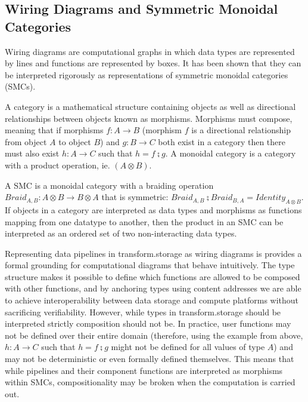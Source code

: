 \documentclass[9pt, oneside]{article}   	%
\begin{document}
\begin{multicols}{2}


\subsection{Wiring Diagrams and Symmetric Monoidal Categories}\label{smc}

Wiring diagrams are computational graphs in which data types are represented by lines and functions are represented by boxes. It has been shown that they can be interpreted rigorously as representations of symmetric monoidal categories (SMCs). \cite{Patterson_2021} 


A category is a mathematical structure containing objects as well as directional relationships between objects known as morphisms. Morphisms must compose, meaning that if morphisms $f : A \rightarrow B$ (morphism $f$ is a directional relationship from object $A$ to object $B$) and $g : B \rightarrow C$ both exist in a category then there must also exist $h : A \rightarrow C$ such that $h = f \zcmp g$. A monoidal category is a category with a product operation, ie. $(A \otimes B)$. 

A SMC is a monoidal category with a braiding operation $Braid_{A,B} : A \otimes B \rightarrow B \otimes A$ that is symmetric: $Braid_{A,B} \zcmp Braid_{B,A}=Identity_{A \otimes B}$. If objects in a category are interpreted as data types and morphisms as functions mapping from one datatype to another, then the product in an SMC can be interpreted as an ordered set of two non-interacting data types. 

Representing data pipelines in transform.storage as wiring diagrams is provides a formal grounding for computational diagrams that behave intuitively. The type structure makes it possible to define which functions are allowed to be composed with other functions, and by anchoring types using content addresses we are able to achieve interoperability between data storage and compute platforms without sacrificing verifiability. However, while types in transform.storage should be interpreted strictly composition should not be. In practice, user functions may not be defined over their entire domain (therefore, using the example from above, $h : A \rightarrow C$ such that $h = f \zcmp g$ might not be defined for all values of type $A$) and may not be deterministic or even formally defined themselves. This means that while pipelines and their component functions are interpreted as morphisms within SMCs, compositionality may be broken when the computation is carried out. 



\end{multicols}
\end{document}
